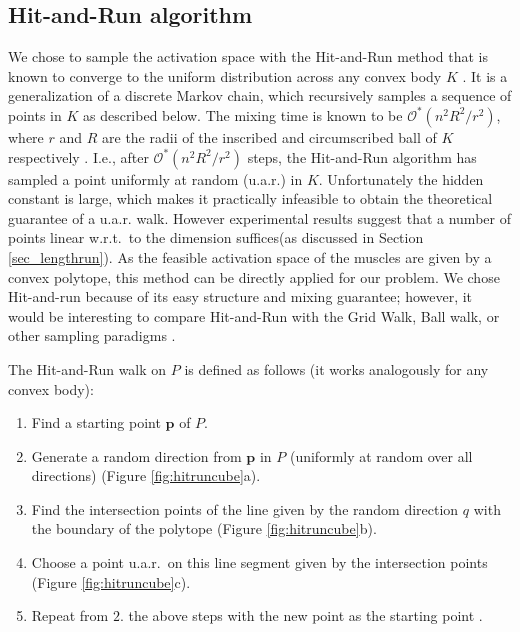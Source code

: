 \subsection{Hit-and-Run algorithm}
\label{ss:hitrun}
We chose to sample the activation space with the Hit-and-Run method that is known to converge to the uniform distribution across any convex body $K$ \cite{smith1984efficient}.
It is a generalization of a discrete Markov chain, which recursively samples a sequence of points in $K$ as described below.
The mixing time is known to be $\mathcal{O}^*(n^2R^2/r^2)$, where $r$ and $R$ are the radii of the inscribed and circumscribed ball of $K$ respectively \cite{Dyer, Lovasz}.
I.e., after $\mathcal{O}^*(n^2R^2/r^2)$ steps, the Hit-and-Run algorithm has sampled a point uniformly at random (u.a.r.) in $K$.
Unfortunately the hidden constant is large, which makes it practically infeasible to obtain the theoretical guarantee of a u.a.r. walk.
However experimental results suggest that a number of points linear w.r.t.\ to the dimension suffices(as discussed in Section \ref{sec_lengthrun}).
As the feasible activation space of the muscles are given by a convex polytope, this method can be directly applied for our problem.
We chose Hit-and-run because of its easy structure and mixing guarantee; however, it would be interesting to compare Hit-and-Run with the Grid Walk, Ball walk, or other sampling paradigms \cite{Vempala}.

The Hit-and-Run walk on $P$ is defined as follows (it works analogously for any convex body):
\begin{enumerate}
\item Find a starting point $\textbf{p}$ of $P$.
\item Generate a random direction from $\textbf{p}$ in $P$ (uniformly at random over all directions) (Figure \ref{fig:hitruncube}a).
\item Find the intersection points of the line given by the random direction $q$ with the boundary of the polytope (Figure \ref{fig:hitruncube}b).
\item Choose a point u.a.r.\ on this line segment given by the intersection points (Figure \ref{fig:hitruncube}c). 
\item Repeat from $2.$ the above steps with the new point as the starting point .
\end{enumerate}

